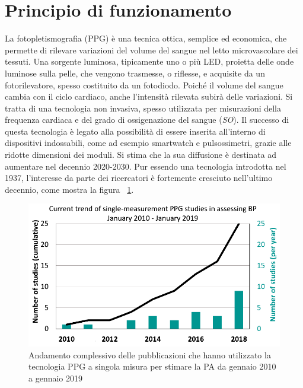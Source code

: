 \section{Principio di funzionamento}
La fotopletismografia (PPG) è una tecnica ottica, semplice ed economica, che permette di rilevare variazioni del volume del sangue nel letto microvascolare dei tessuti\cite{Dey2019}. Una sorgente luminosa, tipicamente uno o più LED, proietta delle onde luminose sulla pelle, che vengono trasmesse, o riflesse, e acquisite da un fotorilevatore, spesso costituito da un fotodiodo. Poiché il volume del sangue cambia con il ciclo cardiaco, anche l'intensità rilevata subirà delle variazioni. Si tratta di una tecnologia non invasiva, spesso utilizzata per misurazioni della frequenza cardiaca e del grado di ossigenazione del sangue (\textit{SO}). Il successo di questa tecnologia è legato alla possibilità di essere inserita all'interno di dispositivi indossabili, come ad esempio smartwatch e pulsossimetri, grazie alle ridotte dimensioni dei moduli. Si stima che la sua diffusione è destinata ad aumentare nel decennio 2020-2030. Pur essendo una tecnologia introdotta nel 1937, l'interesse da parte dei ricercatori è fortemente cresciuto nell'ultimo decennio, come mostra la figura \Fig~\ref{fig:TrendStudies}.
\begin{figure}[h]
	\centering
	\includegraphics[width=0.7\linewidth]{ImageFiles/Fotopletismografia/TrendStudies}
	\caption{Andamento complessivo delle pubblicazioni che hanno utilizzato la tecnologia PPG a singola misura per stimare la PA da gennaio 2010 a gennaio 2019}
	\label{fig:TrendStudies}
\end{figure}
